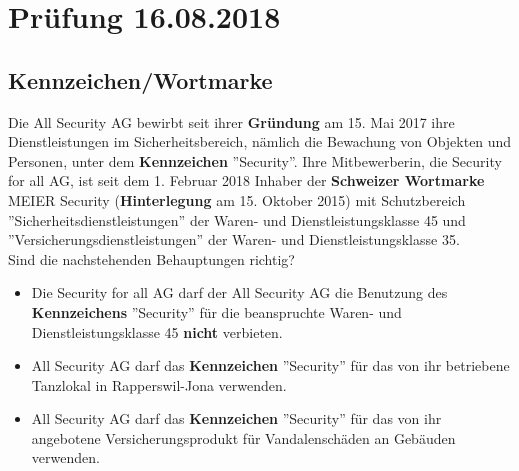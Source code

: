 \section{Prüfung 16.08.2018}
\subsection{Kennzeichen/Wortmarke}
Die All Security AG bewirbt seit ihrer \textbf{Gründung} am 15. Mai 2017 ihre Dienstleistungen im Sicherheitsbereich, nämlich die Bewachung von Objekten und Personen, unter dem \textbf{Kennzeichen} ''Security''. Ihre Mitbewerberin, die Security for all AG, ist seit dem 1. Februar 2018 Inhaber der \textbf{Schweizer Wortmarke} MEIER Security (\textbf{Hinterlegung} am 15. Oktober 2015) mit Schutzbereich ''Sicherheitsdienstleistungen'' der Waren- und Dienstleistungsklasse 45 und ''Versicherungsdienstleistungen'' der Waren- und Dienstleistungsklasse 35.\\
Sind die nachstehenden Behauptungen richtig?
\begin{itemize}
	\item Die Security for all AG darf der All Security AG die Benutzung des \textbf{Kennzeichens} ''Security'' für die beanspruchte Waren- und Dienstleistungsklasse 45 \textbf{nicht} verbieten.
	\item All Security AG darf das \textbf{Kennzeichen} ''Security'' für das von ihr betriebene Tanzlokal in Rapperswil-Jona verwenden.
	\item All Security AG darf das \textbf{Kennzeichen} ''Security'' für das von ihr angebotene Versicherungsprodukt für Vandalenschäden an Gebäuden verwenden.
\end{itemize}

